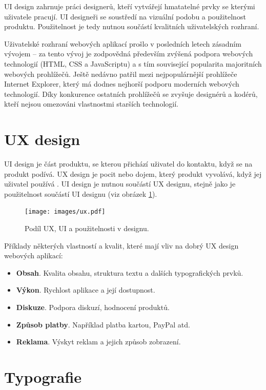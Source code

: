 UI design zahrnuje práci designerů, kteří vytvářejí hmatatelné prvky se kterými uživatele pracují. UI designeři se soustředí na vizuální podobu a použitelnost produktu. Použitelnost je tedy nutnou součástí kvalitních uživatelských rozhraní.

Uživatelské rozhraní webových aplikací prošlo v posledních letech zásadním vývojem -- za tento vývoj je zodpovědná především zvýšená podpora webových technologií (HTML, CSS a JavaScriptu) a s tím související popularita majoritních webových prohlížečů. Ještě nedávno patřil mezi nejpopulárnější prohlížeče Internet Explorer, který má dodnes nejhorší podporu moderních webových technologií. Díky konkurence ostatních prohlížečů se zvyšuje  designérů a kodérů, kteří nejsou omezováni vlastnostmi starších technologií.

\section{UX design}
\label{sec:uxdesign}

UI design je část produktu, se kterou přichází uživatel do kontaktu, když se na produkt podívá. UX design je pocit nebo dojem, který produkt vyvolává, když jej uživatel používá \cite{3}. UI design je nutnou součástí UX designu, stejně jako je použitelnost součástí UI designu (viz obrázek \ref{fig:ux-ui-usability}).

\begin{figure}[htbp]
    \centering
    \texttt{[image: images/ux.pdf]}
    \caption{Podíl UX, UI a použitelnosti v designu.}
    \label{fig:ux-ui-usability}
\end{figure}

Příklady některých vlastností a kvalit, které mají vliv na dobrý UX design webových aplikací:

\begin{itemize}
    \item \textbf{Obsah}. Kvalita obsahu, struktura textu a dalších typografických prvků.
    \item \textbf{Výkon}. Rychlost aplikace a její dostupnost.
    \item \textbf{Diskuze}. Podpora diskuzí, hodnocení produktů.
    \item \textbf{Způsob platby}. Například platba kartou, PayPal atd.
    \item \textbf{Reklama}. Výskyt reklam a jejich způsob zobrazení. \cite{4}
\end{itemize}

\section{Typografie}
\label{sec:typografie}

